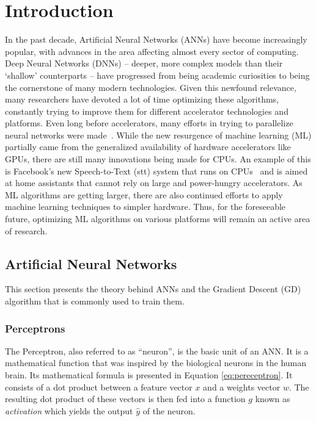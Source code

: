 \section{Introduction} 
%
In the past decade, Artificial Neural Networks (ANNs) have become increasingly popular, with advances in the area affecting almost every sector of computing. Deep Neural Networks (DNNs) \--- deeper, more complex models than their `shallow' counterparts \--- have progressed from being academic curiosities to being the cornerstone of many modern technologies.
Given this newfound relevance, many researchers have devoted a lot of time optimizing these algorithms, constantly trying to improve them for different accelerator technologies and platforms. Even long before accelerators, many efforts in trying to parallelize neural networks were made~\cite{10.1007/BFb0024235}.
While the new resurgence of machine learning (ML) partially came from the generalized availability of hardware accelerators like GPUs, there are still many innovations being made for CPUs. An example of this is Facebook's new Speech-to-Text (stt) system that runs on CPUs~\cite{fbcpu} and is aimed at home assistants that cannot rely on large and power-hungry accelerators.
As ML algorithms are getting larger, there are also continued efforts to apply machine learning techniques to simpler hardware. Thus, for the foreseeable future, optimizing ML algorithms on various platforms will remain an active area of research.

\subsection{Artificial Neural Networks}

This section presents the theory behind ANNs and the Gradient Descent (GD) algorithm that is commonly used to train them.

\subsubsection{Perceptrons}

The Perceptron, also referred to as ``neuron'', is the basic unit of an ANN. It is a mathematical function that was inspired by the biological neurons in the human brain. Its mathematical formula is presented in Equation \ref{eq:pereceptron}. It consists of a dot product between a feature vector $x$ and a weights vector $w$. The resulting dot product of these vectors is then fed into a function $g$ known as \textit{activation} which yields the output $\hat{y}$ of the neuron.


